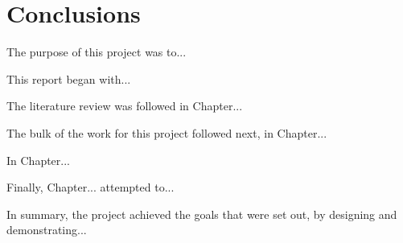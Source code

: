 \documentclass[class=report,11pt,crop=false]{standalone}
\begin{document}
\chapter{Conclusions \label{ch:conclusions}}
\vspace{0.5cm}

The purpose of this project was to...

This report began with...

The literature review was followed in Chapter...

The bulk of the work for this project followed next, in Chapter... 

In Chapter...

Finally, Chapter... attempted to... 

In summary, the project achieved the goals that were set out, by designing and demonstrating...

\ifstandalone

\printnoidxglossary[type=\acronymtype,nonumberlist]
\fi
\end{document}
